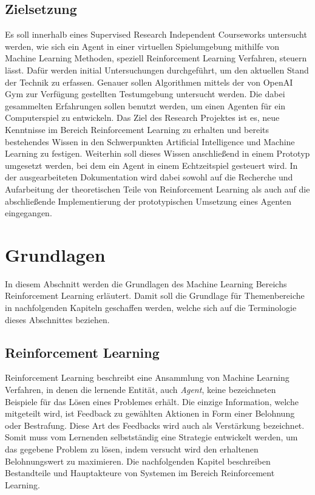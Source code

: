 \documentclass[11pt]{scrartcl}
\begin{document}
\subsection{Zielsetzung}
Es soll innerhalb eines Supervised Research Independent Courseworks untersucht werden, wie
sich ein Agent in einer virtuellen Spielumgebung mithilfe von Machine Learning Methoden,
speziell Reinforcement Learning Verfahren, steuern lässt. Dafür werden initial
Untersuchungen durchgeführt, um den aktuellen Stand der Technik zu erfassen. Genauer
sollen Algorithmen mittels der von OpenAI Gym zur Verfügung gestellten Testumgebung
untersucht werden. Die dabei gesammelten Erfahrungen sollen benutzt werden, um einen
Agenten für ein Computerspiel zu entwickeln. Das Ziel des Research Projektes ist es, neue
Kenntnisse im Bereich Reinforcement Learning zu erhalten und bereits bestehendes Wissen in
den Schwerpunkten Artificial Intelligence und Machine Learning zu festigen. Weiterhin soll
dieses Wissen anschließend in einem Prototyp umgesetzt werden, bei dem ein Agent in einem
Echtzeitspiel gesteuert wird. In der ausgearbeiteten Dokumentation wird dabei sowohl auf die
Recherche und Aufarbeitung der theoretischen Teile von Reinforcement Learning als auch auf
die abschließende Implementierung der prototypischen Umsetzung eines Agenten eingegangen.
\newpage

\section{Grundlagen}
In diesem Abschnitt werden die Grundlagen des Machine Learning Bereichs Reinforcement Learning 
erläutert. Damit soll die Grundlage für Themenbereiche in nachfolgenden Kapiteln geschaffen
werden, welche sich auf die Terminologie dieses Abschnittes beziehen.


\subsection{Reinforcement Learning}
Reinforcement Learning beschreibt eine Ansammlung von Machine Learning Verfahren, in denen die 
lernende Entität, auch \textit{Agent}, keine bezeichneten Beispiele für das Lösen eines Problemes 
erhält. Die einzige Information, welche mitgeteilt wird, ist Feedback zu gewählten Aktionen in Form
einer Belohnung oder Bestrafung. Diese Art des Feedbacks wird auch als Verstärkung bezeichnet.
Somit muss vom Lernenden selbstständig eine Strategie entwickelt werden, um das gegebene
Problem zu lösen, indem versucht wird den erhaltenen Belohnungswert zu maximieren. Die nachfolgenden
Kapitel beschreiben Bestandteile und Hauptakteure von Systemen im Bereich Reinforcement Learning.
\end{document}
